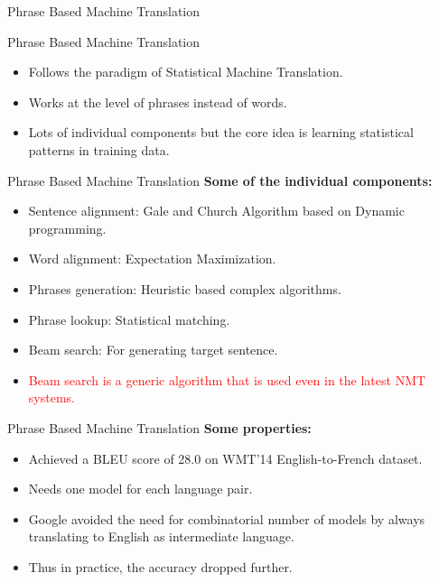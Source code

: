 ﻿\documentclass[table,aspectratio=43,mathserif,xcolor={usenames,dvipsnames,svgnames,table},10pt]{beamer}
\begin{document}
\begin{section}{Phrase Based Machine Translation}
\end{section}

\begin{frame}{Phrase Based Machine Translation}
 \begin{itemize}
  \item<+-> Follows the paradigm of Statistical Machine Translation.
  \item<+-> Works at the level of phrases instead of words.
  \item<+-> Lots of individual components but the core idea is learning statistical patterns in training data.
 \end{itemize}
\end{frame}

\begin{frame}{Phrase Based Machine Translation}
\textbf{Some of the individual components:}
 \begin{itemize}
  \item<+-> Sentence alignment: Gale and Church Algorithm based on Dynamic programming.
  \item<+-> Word alignment: Expectation Maximization.
  \item<+-> Phrases generation: Heuristic based complex algorithms.
  \item<+-> Phrase lookup: Statistical matching.
  \item<+-> Beam search: For generating target sentence.
  \item<+-> \textcolor{red} {Beam search is a generic algorithm that is used even in the latest NMT systems.}
 \end{itemize}
\end{frame}

\begin{frame}{Phrase Based Machine Translation}
\textbf{Some properties:}
 \begin{itemize}
  \item<+-> Achieved a BLEU score of 28.0 on WMT’14 English-to-French dataset.
  \item<+-> Needs one model for each language pair.
  \item<+-> Google avoided the need for combinatorial number of models by always translating to English as intermediate language.
  \item<+-> Thus in practice, the accuracy dropped further. 
  \end{itemize}

\end{frame}
\end{document}
